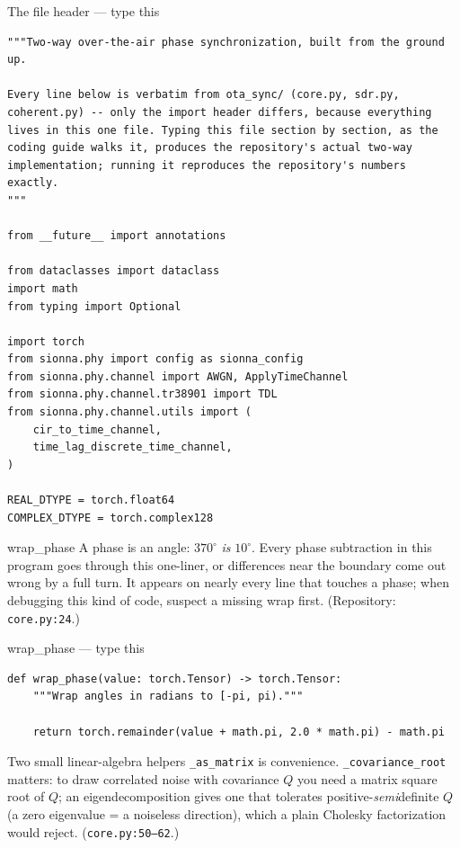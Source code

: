\documentclass[10pt]{beamer}
\begin{document}
\begin{frame}[fragile]{The file header --- type this}
\begin{lstlisting}[basicstyle=\ttfamily\tiny]
"""Two-way over-the-air phase synchronization, built from the ground up.

Every line below is verbatim from ota_sync/ (core.py, sdr.py,
coherent.py) -- only the import header differs, because everything
lives in this one file. Typing this file section by section, as the
coding guide walks it, produces the repository's actual two-way
implementation; running it reproduces the repository's numbers
exactly.
"""

from __future__ import annotations

from dataclasses import dataclass
import math
from typing import Optional

import torch
from sionna.phy import config as sionna_config
from sionna.phy.channel import AWGN, ApplyTimeChannel
from sionna.phy.channel.tr38901 import TDL
from sionna.phy.channel.utils import (
    cir_to_time_channel,
    time_lag_discrete_time_channel,
)

REAL_DTYPE = torch.float64
COMPLEX_DTYPE = torch.complex128
\end{lstlisting}
\end{frame}

\begin{frame}{wrap\_phase}
  A phase is an angle: $370^\circ$ \emph{is} $10^\circ$. Every
  phase subtraction in this program goes through this one-liner,
  or differences near the boundary come out wrong by a full
  turn. It appears on nearly every line that touches a phase;
  when debugging this kind of code, suspect a missing wrap
  first. (Repository: \texttt{core.py:24}.)
\end{frame}

\begin{frame}[fragile]{wrap\_phase --- type this}
\begin{lstlisting}[basicstyle=\ttfamily\tiny]
def wrap_phase(value: torch.Tensor) -> torch.Tensor:
    """Wrap angles in radians to [-pi, pi)."""

    return torch.remainder(value + math.pi, 2.0 * math.pi) - math.pi
\end{lstlisting}
\end{frame}

\begin{frame}{Two small linear-algebra helpers}
  \texttt{\_as\_matrix} is convenience. \texttt{\_covariance\_root}
  matters: to draw correlated noise with covariance $Q$ you need
  a matrix square root of $Q$; an eigendecomposition gives one
  that tolerates positive-\emph{semi}definite $Q$ (a zero
  eigenvalue = a noiseless direction), which a plain Cholesky
  factorization would reject. (\texttt{core.py:50--62}.)
\end{frame}
\end{document}
